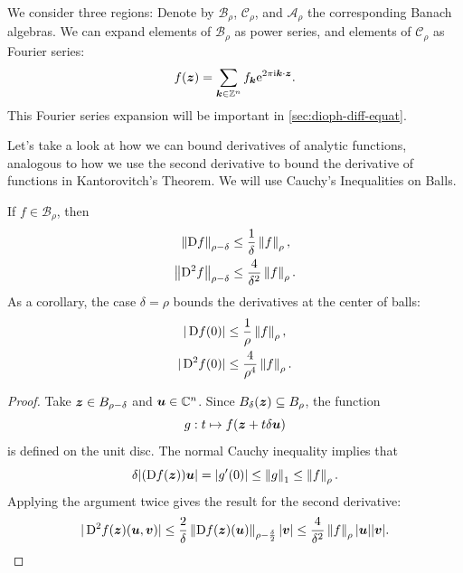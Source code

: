\documentclass[twoside,letterpaper,10pt]{article}
\numberwithin{equation}{section}
\begin{document}
We consider three regions:
\domains{}
Denote by $\mathcal{B}_{\rho}$, $\mathcal{C}_{\rho}$, and $\mathcal{A}_{\rho}$
the corresponding Banach algebras.
We can expand elements of $\mathcal{B}_{\rho}$ as power series, and elements of
$\mathcal{C}_{\rho}$ as Fourier series:
\begin{equation*}
  f(\bm{z}) = \sum_{\bm{k} \in \mathbb{Z}^n} f_{\bm{k}} \mathrm{e}^{2 \pi \mathrm{i} \bm{k} \cdot \bm{z}}.
\end{equation*}
This Fourier series expansion will be important in \cref{sec:dioph-diff-equat}.

Let's take a look at how we can bound derivatives of analytic functions,
analogous to how we use the second derivative to bound the derivative of
functions in Kantorovitch's Theorem.
We will use Cauchy's Inequalities on Balls.
\begin{thm}
  If $f \in \mathcal{B}_{\rho}$, then
  \begin{align*}
    \norm{\Dif f}_{\rho - \delta} &\leq \frac{1}{\delta} \norm{f}_{\rho},\\
    \norm{\Dif^2 f}_{\rho - \delta} &\leq \frac{4}{\delta^2} \norm{f}_{\rho}.
  \end{align*}
  As a corollary, the case $\delta = \rho$ bounds the derivatives at the center
  of balls:
  \begin{align*}
    |\Dif f(0)| &\leq \frac{1}{\rho} \norm{f}_{\rho},\\
    |\Dif^2 f(0)| &\leq \frac{4}{\rho^4} \norm{f}_{\rho}.
  \end{align*}
\end{thm}
\begin{proof}
  Take $\bm{z} \in B_{\rho - \delta}$ and $\bm{u} \in \mathbb{C}^n$.
  Since $B_{\delta}(\bm{z}) \subseteq B_{\rho}$, the function
  \begin{equation*}
    g : t \mapsto f(\bm{z} + t \delta \bm{u})
  \end{equation*}
  is defined on the unit disc.
  The normal Cauchy inequality implies that
  \begin{equation*}
    \delta|(\Dif f(\bp{z})) \bp{u}| = |g'(0)| \leq \norm{g}_{1} \leq
    \norm{f}_{\rho}.
  \end{equation*}
  Applying the argument twice gives the result for the second derivative:
  \begin{equation*}
    |\Dif^2 f(\bp{z})(\bp{u}, \bp{v})| \leq \frac{2}{\delta} \norm{\Dif f
      (\bp{z})(\bp{u})}_{\rho - \frac{\delta}{2}}|\bp{v}| \leq
    \frac{4}{\delta^2} \norm{f}_{\rho} |\bp{u}||\bp{v}|.
  \end{equation*}
\end{proof}
\end{document}
